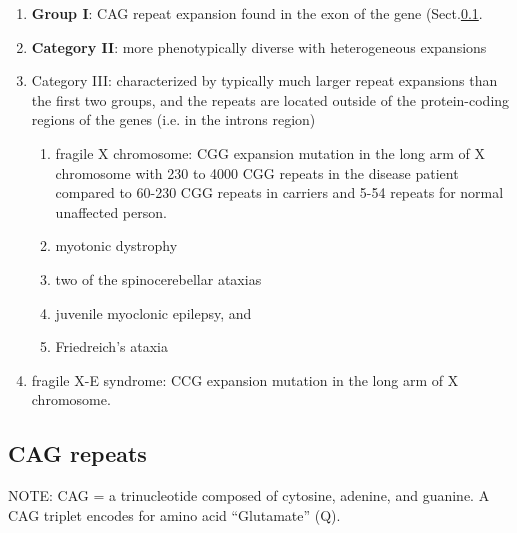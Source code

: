 \begin{enumerate}  
  
  \item {\bf Group I}: CAG repeat expansion found in the exon of the gene
  (Sect.\ref{sec:CAG-expansion}.

  \item  {\bf Category II}: more phenotypically diverse with heterogeneous
  expansions
    
  \item Category III: characterized by typically much larger repeat expansions
  than the first two groups, and the repeats are located outside of the
  protein-coding regions of the genes (i.e. in the introns region)
  \begin{enumerate}
  \item fragile X chromosome: CGG expansion mutation in the long arm of X
  chromosome with 230 to 4000 CGG repeats in the disease patient compared to 60-230 CGG
  repeats in carriers and 5-54 repeats for normal unaffected person.
    \item myotonic dystrophy
    \item two of the spinocerebellar ataxias
    \item juvenile myoclonic epilepsy, and 
    \item Friedreich's ataxia
  \end{enumerate}

   \item fragile X-E syndrome: CCG expansion mutation in the long arm of X
  chromosome.
  
\end{enumerate}

\subsection{CAG repeats}
\label{sec:CAG-expansion}
\label{sec:polyglutamine-diseases}

NOTE:  CAG = a trinucleotide composed of cytosine, adenine, and guanine.
A CAG triplet encodes for amino acid ``Glutamate'' (Q).

